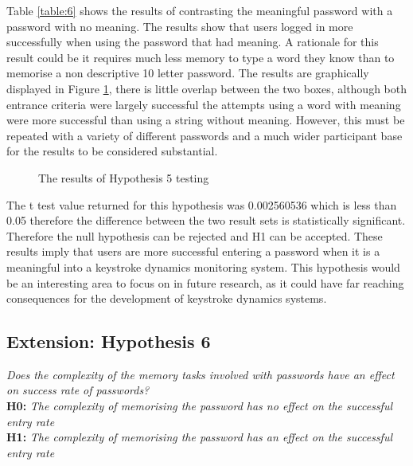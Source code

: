 \documentclass{article}
\begin{document}
Table \ref{table:6} shows the results of contrasting the meaningful password with a password with no meaning. The results show that users logged in more successfully when using the password that had meaning. A rationale for this result could be it requires much less memory to type a word they know than to memorise a non descriptive 10 letter password. The results are graphically displayed in Figure \ref{fig:boxPlotHyp5}, there is little overlap between the two boxes, although both entrance criteria were largely successful the attempts using a word with meaning were more successful than using a string without meaning. However, this must be repeated with a variety of different passwords and a much wider participant base for the results to be considered substantial. 

\begin{figure} [H]
    \centering
    \caption{The results of Hypothesis 5 testing}
    \label{fig:boxPlotHyp5}
\end{figure}

The t test value returned for this hypothesis was 0.002560536 which is less than 0.05 therefore the difference between the two result sets is statistically significant. Therefore the null hypothesis can be rejected and H1 can be accepted. These results imply that users are more successful entering a password when it is a meaningful into a keystroke dynamics monitoring system. This hypothesis would be an interesting area to focus on in future research, as it could have far reaching consequences for the development of keystroke dynamics systems.  

\subsection{Extension: Hypothesis 6}
\begin{center}
\textit{Does the complexity of the memory tasks involved with passwords have an effect on success rate of passwords?} \newline \\
\textbf{H0:} \textit{The complexity of memorising the password has no effect on the successful entry rate} \newline \\
\textbf{H1:} \textit{The complexity of memorising the password has an effect on the successful entry rate}
\end{center}
\end{document}
